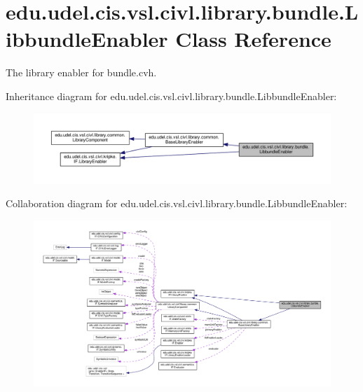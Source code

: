 \hypertarget{classedu_1_1udel_1_1cis_1_1vsl_1_1civl_1_1library_1_1bundle_1_1LibbundleEnabler}{}\section{edu.\+udel.\+cis.\+vsl.\+civl.\+library.\+bundle.\+Libbundle\+Enabler Class Reference}
\label{classedu_1_1udel_1_1cis_1_1vsl_1_1civl_1_1library_1_1bundle_1_1LibbundleEnabler}


The library enabler for bundle.\+cvh.  




Inheritance diagram for edu.\+udel.\+cis.\+vsl.\+civl.\+library.\+bundle.\+Libbundle\+Enabler\+:
\nopagebreak
\begin{figure}[H]
\begin{center}
\leavevmode
\includegraphics[width=350pt]{classedu_1_1udel_1_1cis_1_1vsl_1_1civl_1_1library_1_1bundle_1_1LibbundleEnabler__inherit__graph}
\end{center}
\end{figure}


Collaboration diagram for edu.\+udel.\+cis.\+vsl.\+civl.\+library.\+bundle.\+Libbundle\+Enabler\+:
\nopagebreak
\begin{figure}[H]
\begin{center}
\leavevmode
\includegraphics[width=350pt]{classedu_1_1udel_1_1cis_1_1vsl_1_1civl_1_1library_1_1bundle_1_1LibbundleEnabler__coll__graph}
\end{center}
\end{figure}
